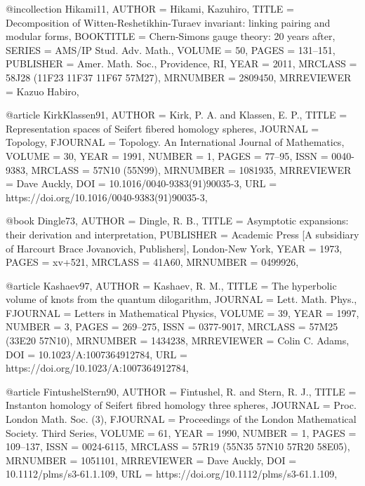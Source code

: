 @incollection {Hikami11,
    AUTHOR = {Hikami, Kazuhiro},
     TITLE = {Decomposition of {W}itten-{R}eshetikhin-{T}uraev invariant:
              linking pairing and modular forms},
 BOOKTITLE = {Chern-{S}imons gauge theory: 20 years after},
    SERIES = {AMS/IP Stud. Adv. Math.},
    VOLUME = {50},
     PAGES = {131--151},
 PUBLISHER = {Amer. Math. Soc., Providence, RI},
      YEAR = {2011},
   MRCLASS = {58J28 (11F23 11F37 11F67 57M27)},
  MRNUMBER = {2809450},
MRREVIEWER = {Kazuo Habiro},
}

@article {KirkKlassen91,
    AUTHOR = {Kirk, P. A. and Klassen, E. P.},
     TITLE = {Representation spaces of {S}eifert fibered homology spheres},
   JOURNAL = {Topology},
  FJOURNAL = {Topology. An International Journal of Mathematics},
    VOLUME = {30},
      YEAR = {1991},
    NUMBER = {1},
     PAGES = {77--95},
      ISSN = {0040-9383},
   MRCLASS = {57N10 (55N99)},
  MRNUMBER = {1081935},
MRREVIEWER = {Dave Auckly},
       DOI = {10.1016/0040-9383(91)90035-3},
       URL = {https://doi.org/10.1016/0040-9383(91)90035-3},
}

@book {Dingle73,
    AUTHOR = {Dingle, R. B.},
     TITLE = {Asymptotic expansions: their derivation and interpretation},
 PUBLISHER = {Academic Press [A subsidiary of Harcourt Brace Jovanovich,
              Publishers], London-New York},
      YEAR = {1973},
     PAGES = {xv+521},
   MRCLASS = {41A60},
  MRNUMBER = {0499926},
}

@article {Kashaev97,
    AUTHOR = {Kashaev, R. M.},
     TITLE = {The hyperbolic volume of knots from the quantum dilogarithm},
   JOURNAL = {Lett. Math. Phys.},
  FJOURNAL = {Letters in Mathematical Physics},
    VOLUME = {39},
      YEAR = {1997},
    NUMBER = {3},
     PAGES = {269--275},
      ISSN = {0377-9017},
   MRCLASS = {57M25 (33E20 57N10)},
  MRNUMBER = {1434238},
MRREVIEWER = {Colin C. Adams},
       DOI = {10.1023/A:1007364912784},
       URL = {https://doi.org/10.1023/A:1007364912784},
}

@article {FintushelStern90,
    AUTHOR = {Fintushel, R. and Stern, R. J.},
     TITLE = {Instanton homology of {S}eifert fibred homology three spheres},
   JOURNAL = {Proc. London Math. Soc. (3)},
  FJOURNAL = {Proceedings of the London Mathematical Society. Third Series},
    VOLUME = {61},
      YEAR = {1990},
    NUMBER = {1},
     PAGES = {109--137},
      ISSN = {0024-6115},
   MRCLASS = {57R19 (55N35 57N10 57R20 58E05)},
  MRNUMBER = {1051101},
MRREVIEWER = {Dave Auckly},
       DOI = {10.1112/plms/s3-61.1.109},
       URL = {https://doi.org/10.1112/plms/s3-61.1.109},
}

